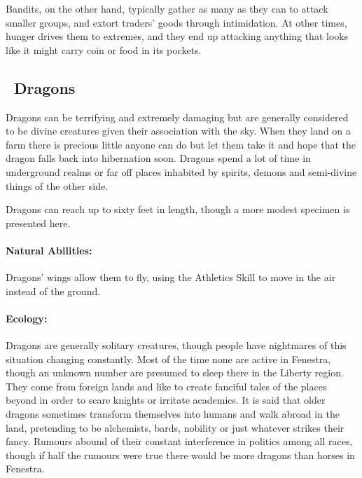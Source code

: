 \begin{multicols}{2}
\label{brigand}

Bandits, on the other hand, typically gather as many as they can to attack smaller groups, and extort traders' goods through intimidation.
At other times, hunger drives them to extremes, and they end up attacking anything that looks like it might carry coin or food in its pockets.

\label{bandit}


\subsection[Dragons]{\E\ Dragons}
\label{dragon}

Dragons can be terrifying and extremely damaging but are generally considered to be divine creatures given their association with the sky.
When they land on a farm there is precious little anyone can do but let them take it and hope that the dragon falls back into hibernation soon.
Dragons spend a lot of time in underground realms or far off places inhabited by spirits, demons and semi-divine things of the other side.

Dragons can reach up to sixty feet in length, though a more modest specimen is presented here.

\paragraph{Natural Abilities:}
Dragons' wings allow them to fly, using the Athletics Skill to move in the air instead of the ground.

\paragraph{Ecology:} Dragons are generally solitary creatures, though people have nightmares of this situation changing constantly.
Most of the time none are active in Fenestra, though an unknown number are presumed to sleep there in the Liberty region.
They come from foreign lands and like to create fanciful tales of the places beyond in order to scare knights or irritate academics.
It is said that older dragons sometimes transform themselves into humans and walk abroad in the land, pretending to be alchemists, bards, nobility or just whatever strikes their fancy.
Rumours abound of their constant interference in politics among all races, though if half the rumours were true there would be more dragons than horses in Fenestra.


\end{multicols}
